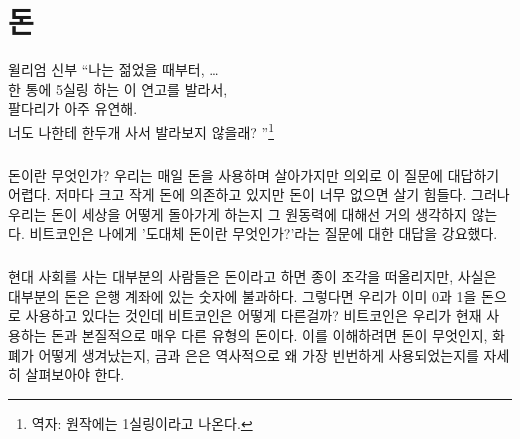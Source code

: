 \chapter{돈}
\label{les:11}

\begin{chapquote}{윌리엄 신부}
	\enquote{나는 젊었을 때부터, \ldots \\
		한 통에 5실링 하는 이 연고를 발라서, \\
		팔다리가 아주 유연해. \\
		너도 나한테 한두개 사서 발라보지 않을래?
	}\footnote{역자: 원작에는 1실링이라고 나온다.}
\end{chapquote}



\paragraph{}
돈이란 무엇인가? 
우리는 매일 돈을 사용하며 살아가지만 의외로 이 질문에 대답하기 어렵다. 
저마다 크고 작게 돈에 의존하고 있지만 돈이 너무 없으면 살기 힘들다.
그러나 우리는 돈이 세상을 어떻게 돌아가게 하는지 그 원동력에 대해선 거의 생각하지 않는다.
비트코인은 나에게 '도대체 돈이란 무엇인가?'라는 질문에 대한 대답을 강요했다.



\paragraph{}
현대 사회를 사는 대부분의 사람들은 돈이라고 하면 종이 조각을 떠올리지만, 사실은 대부분의 돈은 은행 계좌에 있는 숫자에 불과하다.
그렇다면 우리가 이미 0과 1을 돈으로 사용하고 있다는 것인데 비트코인은 어떻게 다른걸까? 
비트코인은 우리가 현재 사용하는 돈과 본질적으로 매우 다른 유형의 돈이다. 
이를 이해하려면 돈이 무엇인지, 화폐가 어떻게 생겨났는지, 
금과 은은 역사적으로 왜 가장 빈번하게 사용되었는지를 자세히 살펴보아야 한다.

